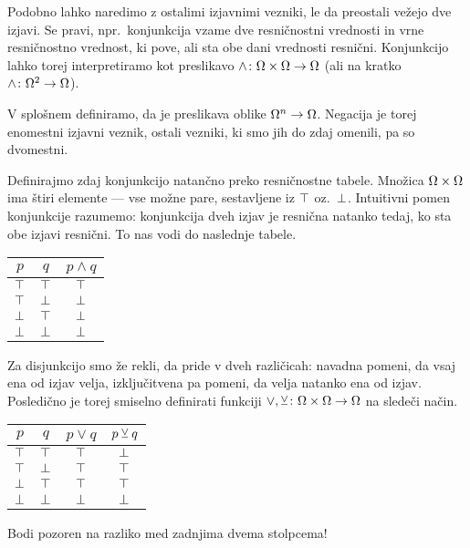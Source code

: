 		Podobno lahko naredimo z ostalimi izjavnimi vezniki, le da preostali vežejo dve izjavi. Se pravi, npr.~konjunkcija vzame dve resničnostni vrednosti in vrne resničnostno vrednost, ki pove, ali sta obe dani vrednosti resnični. Konjunkcijo lahko torej interpretiramo kot preslikavo $\land\colon \Omega \times \Omega \to \Omega$ (ali na kratko $\land\colon \Omega^2 \to \Omega$).
		
		V splošnem definiramo, da je  preslikava oblike $\Omega^n \to \Omega$. Negacija je torej enomestni izjavni veznik, ostali vezniki, ki smo jih do zdaj omenili, pa so dvomestni.
		
		Definirajmo zdaj konjunkcijo natančno preko resničnostne tabele. Množica $\Omega \times \Omega$ ima štiri elemente --- vse možne pare, sestavljene iz $\top$ oz.~$\bot$. Intuitivni pomen konjunkcije razumemo: konjunkcija dveh izjav je resnična natanko tedaj, ko sta obe izjavi resnični. To nas vodi do naslednje tabele.
		\begin{center}
			\begin{tabular}{cc|c}
				$p$ & $q$ & $p \land q$ \\
				\hline
				$\top$ & $\top$ & $\top$ \\
				$\top$ & $\bot$ & $\bot$ \\
				$\bot$ & $\top$ & $\bot$ \\
				$\bot$ & $\bot$ & $\bot$
			\end{tabular}
		\end{center}
		
		Za disjunkcijo smo že rekli, da pride v dveh različicah: navadna pomeni, da vsaj ena od izjav velja, izključitvena pa pomeni, da velja natanko ena od izjav. Posledično je torej smiselno definirati funkciji $\lor, \mathbin{\veebar}\colon \Omega \times \Omega \to \Omega$ na sledeči način.
		\begin{center}
			\begin{tabular}{cc|cc}
				$p$ & $q$ & $p \lor q$ & $p \mathbin{\veebar} q$ \\
				\hline
				$\top$ & $\top$ & $\top$ & $\bot$ \\
				$\top$ & $\bot$ & $\top$ & $\top$ \\
				$\bot$ & $\top$ & $\top$ & $\top$ \\
				$\bot$ & $\bot$ & $\bot$ & $\bot$
			\end{tabular}
		\end{center}
		Bodi pozoren na razliko med zadnjima dvema stolpcema!
		
